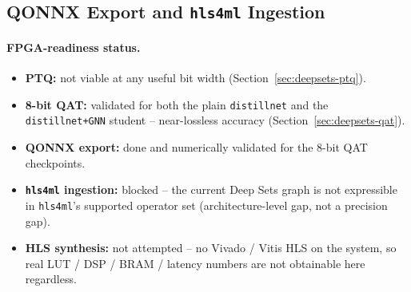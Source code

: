 \subsection{QONNX Export and \texttt{hls4ml} Ingestion}
\label{sec:deepsets-hls4ml}

\paragraph{FPGA-readiness status.}
\begin{itemize}
    \item \textbf{PTQ:} not viable at any useful bit width
    (Section~\ref{sec:deepsets-ptq}).
    \item \textbf{8-bit QAT:} validated for both the plain \texttt{distillnet}
    and the \texttt{distillnet+GNN} student -- near-lossless accuracy
    (Section~\ref{sec:deepsets-qat}).
    \item \textbf{QONNX export:} done and numerically validated for the
    8-bit QAT checkpoints.
    \item \textbf{\texttt{hls4ml} ingestion:} blocked -- the current
    Deep Sets graph is not expressible in \texttt{hls4ml}'s supported
    operator set (architecture-level gap, not a precision gap).
    \item \textbf{HLS synthesis:} not attempted -- no Vivado / Vitis HLS on
    the system, so real LUT / DSP / BRAM / latency numbers are not
    obtainable here regardless.
\end{itemize}


